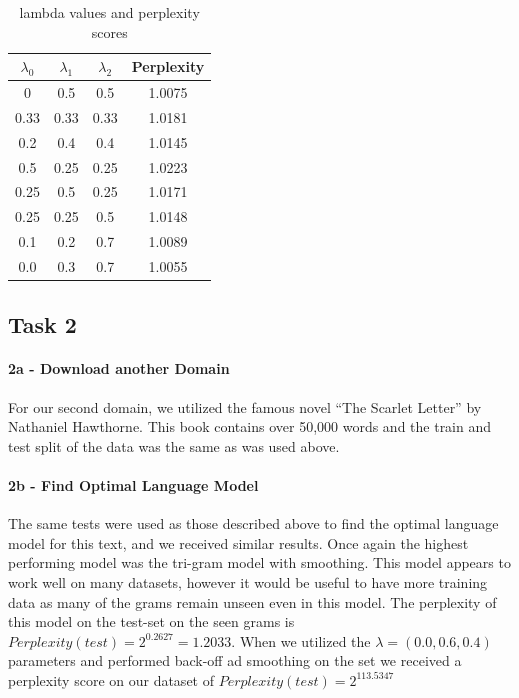 \documentclass[paper=a4, fontsize=11pt]{scrartcl} %
\begin{document}
\begin{table}
\centering
\label{tab:table1}
\caption{lambda values and perplexity scores}
\begin{tabular}{|c|c|c|c|}
\hline
$\lambda_0$ & $\lambda_1$ & $\lambda_2$ & Perplexity \\ \hline \hline
0 & 0.5 & 0.5 & 1.0075  \\ \hline
0.33 & 0.33 & 0.33 & 1.0181 \\ \hline
0.2 & 0.4 & 0.4 & 1.0145 \\ \hline
0.5 & 0.25 & 0.25 & 1.0223 \\ \hline
0.25 & 0.5 & 0.25 & 1.0171 \\ \hline
0.25 & 0.25 & 0.5 & 1.0148 \\ \hline
0.1 & 0.2 & 0.7 & 1.0089 \\ \hline
0.0 & 0.3 & 0.7 & 1.0055 \\ \hline
\end{tabular}
\end{table}

\subsection{Task 2}
\paragraph{2a - Download another Domain}
For our second domain, we utilized the famous novel ``The Scarlet Letter'' by Nathaniel Hawthorne.  This book contains over 50,000 words and the train and test split of the data was the same as was used above.

\paragraph{2b - Find Optimal Language Model}
The same tests were used as those described above to find the optimal language model for this text, and we received similar results.  Once again the highest performing model was the tri-gram model with smoothing.  This model appears to work well on many datasets, however it would be useful to have more training data as many of the grams remain unseen even in this model.  The perplexity of this model on the test-set on the seen grams is $Perplexity(test)=2^{0.2627}=1.2033$.  When we utilized the $\lambda=(0.0,0.6,0.4)$ parameters and performed back-off ad smoothing on the set we received a perplexity score on our dataset of $Perplexity(test)=2^{113.5347}$
\end{document}
